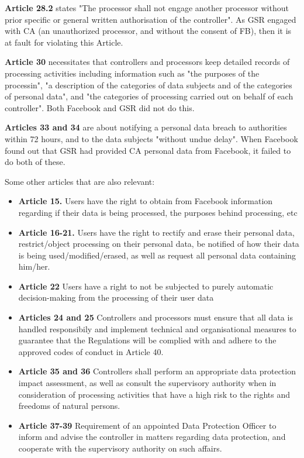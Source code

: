 \documentclass[a4paper]{article}
\begin{document}
\textbf{Article 28.2} states "The processor shall not engage another processor without prior specific or general written authorisation of the controller". As GSR engaged with CA (an unauthorized processor, and without the consent of FB), then it is at fault for violating this Article.

\textbf{Article 30} necessitates that controllers and processors keep detailed records of processing activities including information such as "the purposes of the processin", "a description of the categories of data subjects and of the categories of personal data", and "the categories of processing carried out on behalf of each controller". Both Facebook and GSR did not do this.

\textbf{Articles 33 and 34} are about notifying a personal data breach to authorities within 72 hours, and to the data subjects "without undue delay". When Facebook found out that GSR had provided CA personal data from Facebook, it failed to do both of these.

Some other articles that are also relevant:
\begin{itemize}
	\item \textbf{Article 15.} Users have the right to obtain from Facebook information regarding if their data is being processed, the purposes behind processing, etc 
	\item \textbf{Article 16-21.}  Users have the right to rectify and erase their personal data, restrict/object processing on their personal data, be notified of how their data is being used/modified/erased, as well as request all personal data containing him/her.
	\item \textbf{Article 22} Users have a right to not be subjected to purely automatic decision-making from the processing of their user data
	\item \textbf{Articles 24 and 25} Controllers and processors must ensure that all data is handled responsibily and implement technical and organisational measures to guarantee that the Regulations will be complied with and adhere to the approved codes of conduct in Article 40.
	\item \textbf{Article 35 and 36} Controllers shall perform an appropriate data protection impact assessment, as well as consult the supervisory authority when in consideration of processing activities that have a high risk to the rights and freedoms of natural persons.
	\item \textbf{Article 37-39} Requirement of an appointed Data Protection Officer to inform and advise the controller in matters regarding data protection, and cooperate with the supervisory authority on such affairs.

\end{itemize}
\end{document}
